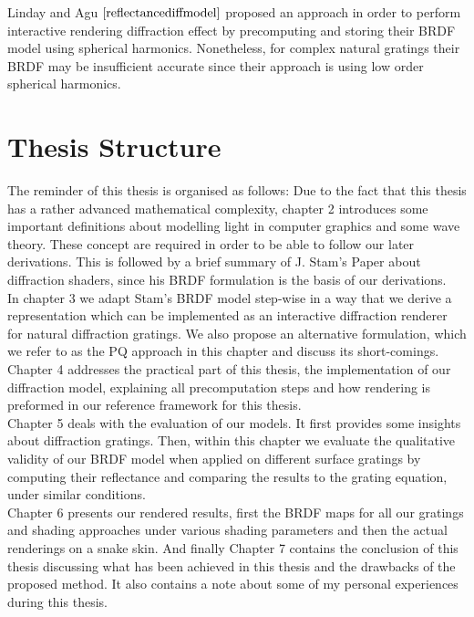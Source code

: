 Linday and Agu $\cite{reflectancediffmodel}$ proposed an approach in order to perform interactive rendering diffraction effect by precomputing and storing their BRDF model using spherical harmonics. Nonetheless, for complex natural gratings their BRDF may be insufficient accurate since their approach is using low order spherical harmonics.

\section{Thesis Structure}
The reminder of this thesis is organised as follows: Due to the fact that this thesis has a rather advanced mathematical complexity, chapter 2 introduces some important definitions about modelling light in computer graphics and some wave theory. These concept are required in order to be able to follow our later derivations. This is followed by a brief summary of J. Stam's Paper about diffraction shaders, since his BRDF formulation is the basis of our derivations. \\

In chapter 3 we adapt Stam's BRDF model step-wise in a way that we derive a representation which can be implemented as an interactive diffraction renderer for natural diffraction gratings. We also propose an alternative formulation, which we refer to as the PQ approach in this chapter and discuss its short-comings. \\

Chapter 4 addresses the practical part of this thesis, the implementation of our diffraction model, explaining all precomputation steps and how rendering is preformed in our reference framework for this thesis. \\

Chapter 5 deals with the evaluation of our models. It first provides some insights about diffraction gratings. Then, within this chapter we evaluate the qualitative validity of our BRDF model when applied on different surface gratings by computing their reflectance and comparing the results to the grating equation, under similar conditions. \\

Chapter 6 presents our rendered results, first the BRDF maps for all our gratings and shading approaches under various shading parameters and then the actual renderings on a snake skin. And finally Chapter 7 contains the conclusion of this thesis discussing what has been achieved in this thesis and the drawbacks of the proposed method. It also contains a note about some of my personal experiences during this thesis.
